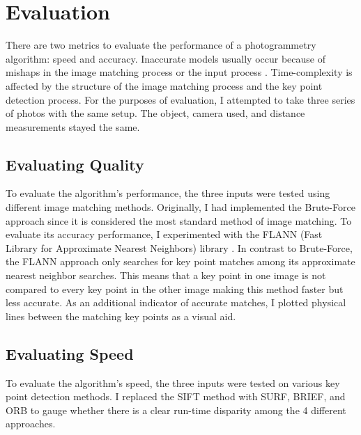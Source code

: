 \documentclass[10pt,twocolumn]{article}
\begin{document}
\section{Evaluation}
There are two metrics to evaluate the performance of a photogrammetry algorithm: speed and accuracy. Inaccurate models usually occur because of mishaps in the image matching process or the input process \cite{jayanthi2016comparison}. Time-complexity is affected by the structure of the image matching process and the key point detection process. 
For the purposes of evaluation, I attempted to take three series of photos with the same setup. The object, camera used, and distance measurements stayed the same.
\subsection{Evaluating Quality}
To evaluate the algorithm's performance, the three inputs were tested using different image matching methods. Originally, I had implemented the Brute-Force approach since it is considered the most standard method of image matching. To evaluate its accuracy performance, I experimented with the FLANN (Fast Library for Approximate Nearest Neighbors) library \cite{muja2009flann}. In contrast to Brute-Force, the FLANN approach only searches for key point matches among its approximate nearest neighbor searches. This means that a key point in one image is not compared to every key point in the other image making this method faster but less accurate. As an additional indicator of accurate matches, I plotted physical lines between the matching key points as a visual aid.

\subsection{Evaluating Speed}
To evaluate the algorithm's speed, the three inputs were tested on various key point detection methods. I replaced the SIFT method with SURF, BRIEF, and ORB to gauge whether there is a clear run-time disparity among the 4 different approaches.
\end{document}
